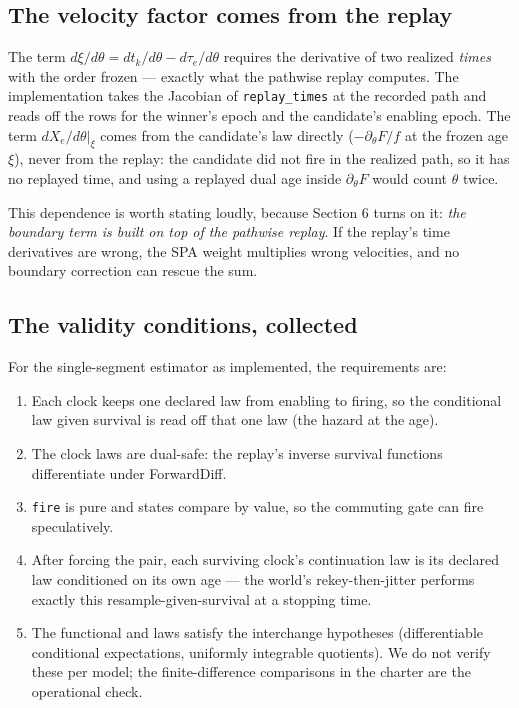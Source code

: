 \documentclass[11pt]{article}
\newcommand{\code}[1]{\texttt{#1}}
\begin{document}
\subsection{The velocity factor comes from the replay}

The term $d\xi/d\theta = dt_k/d\theta - d\tau_e/d\theta$ requires the
derivative of two realized \emph{times} with the order frozen --- exactly
what the pathwise replay computes. The implementation takes the Jacobian
of \code{replay\_times} at the recorded path and reads off the rows for
the winner's epoch and the candidate's enabling epoch. The term
$dX_e/d\theta|_\xi$ comes from the candidate's law directly
($-\partial_\theta F / f$ at the frozen age $\xi$), never from the
replay: the candidate did not fire in the realized path, so it has no
replayed time, and using a replayed dual age inside $\partial_\theta F$
would count $\theta$ twice.

This dependence is worth stating loudly, because Section 6 turns on it:
\emph{the boundary term is built on top of the pathwise replay}. If the
replay's time derivatives are wrong, the SPA weight multiplies wrong
velocities, and no boundary correction can rescue the sum.

\subsection{The validity conditions, collected}

For the single-segment estimator as implemented, the requirements are:

\begin{enumerate}
\item Each clock keeps one declared law from enabling to firing, so the
  conditional law given survival is read off that one law (the hazard at
  the age).
\item The clock laws are dual-safe: the replay's inverse survival
  functions differentiate under ForwardDiff.
\item \code{fire} is pure and states compare by value, so the commuting
  gate can fire speculatively.
\item After forcing the pair, each surviving clock's continuation law is
  its declared law conditioned on its own age --- the world's
  rekey-then-jitter performs exactly this resample-given-survival at a
  stopping time.
\item The functional and laws satisfy the interchange hypotheses
  (differentiable conditional expectations, uniformly integrable
  quotients). We do not verify these per model; the finite-difference
  comparisons in the charter are the operational check.
\end{enumerate}
\end{document}
